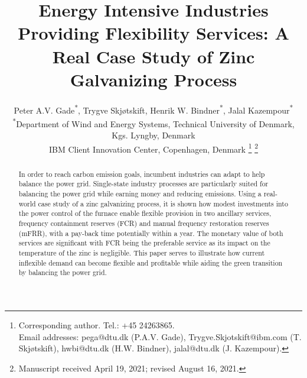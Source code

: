 \documentclass[lettersize,journal]{IEEEtran}
\begin{document}
\title{Energy Intensive Industries Providing Flexibility Services: A Real Case Study of Zinc Galvanizing Process}


\author{Peter A.V. Gade\textsuperscript{*}\textsuperscript{\textdagger}, Trygve Skjøtskift\textsuperscript{\textdagger}, Henrik W. Bindner\textsuperscript{*}, Jalal Kazempour\textsuperscript{*} \\
    \textsuperscript{*}Department of Wind and Energy Systems, Technical University of Denmark, Kgs. Lyngby, Denmark \\
    \textsuperscript{\textdagger}IBM Client Innovation Center, Copenhagen, Denmark
    \thanks{Corresponding author. Tel.: +45 24263865. \\ Email addresses: pega@dtu.dk (P.A.V. Gade), Trygve.Skjotskift@ibm.com (T. Skjøtskift), hwbi@dtu.dk (H.W. Bindner), jalal@dtu.dk (J. Kazempour).}%
    \thanks{Manuscript received April 19, 2021; revised August 16, 2021.}}




\maketitle


\begin{abstract}
    In order to reach carbon emission goals, incumbent industries can adapt to help balance the power grid. Single-state industry processes are particularly suited for balancing the power grid while earning money and reducing emissions. Using a real-world case study of a zinc galvanizing process, it is shown how modest investments into the power control of the furnace enable flexible provision in two ancillary services, frequency containment reserves (FCR) and manual
    frequency restoration reserves (mFRR), with a pay-back time potentially within a year. The monetary value of both services are significant with FCR being the preferable service as its impact on the temperature of the zinc is negligible. This paper serves to illustrate how current inflexible demand can become flexible and profitable while aiding the green transition by balancing the power grid.
\end{abstract}
\end{document}
